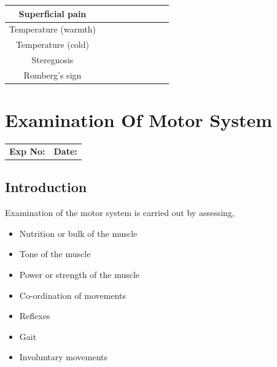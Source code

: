 \documentclass[a4paper,12pt]{book}
\begin{document}
\begin{table}[H]
{\begin{tabular}{|c|c|c|c|c|c|c|c|c|}
Superficial pain                    &                    &                   &                    &                   &                   &                  &                   &                  \\ \hline
Temperature (warmth)                &                    &                   &                    &                   &                   &                  &                   &                  \\ \hline
Temperature (cold)                  &                    &                   &                    &                   &                   &                  &                   &                  \\ \hline
Steregnosis                         &                    &                   &                    &                   &                   &                  &                   &                  \\ \hline
Romberg's sign                      & \multicolumn{8}{c|}{}                                                                                                                                         \\ \hline
\end{tabular}%
}
\end{table}
\renewcommand{\arraystretch}{1}
															\chapter*{\centering Examination Of Motor System}
															\begin{tabular}{p{5in} p{1in}}
																\textbf{Exp No:}  & \textbf{Date:}\\
															\end{tabular}
															\section*{Introduction}
Examination of the motor system is carried out by assessing,
\begin{itemize}
\item{Nutrition or bulk of the muscle}
\item{Tone of the muscle}
\item{Power or strength of the muscle}
\item{Co-ordination of movements}
\item{Reflexes}
\item{Gait}
\item{Involuntary movements}
\end{itemize}
\end{document}
